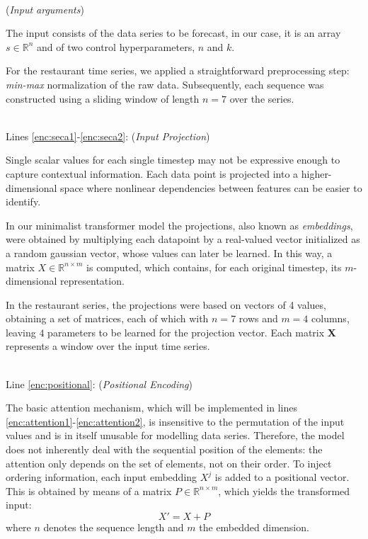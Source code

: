\documentclass[algorithms,article,submit,pdftex,moreauthors]{Definitions/mdpi}
\begin{document}
~\\(\textit{Input arguments})

The input consists of the data series to be forecast, in our case, it is an array $s \in \mathbb{R}^n$ and of two control hyperparameters, $n$ and $k$.

For the restaurant time series, we applied a straightforward preprocessing step: \textit{min-max} normalization of the raw data. Subsequently, each sequence was constructed using a sliding window of length $n = 7$ over the series.

~\\Lines \ref{enc:seca1}-\ref{enc:seca2}: (\textit{Input Projection})

Single scalar values for each single timestep may not be expressive enough to capture contextual information. Each data point is projected into a higher-dimensional space where nonlinear dependencies between features can be easier to identify. 

In our minimalist transformer model the projections, also known as {\em embeddings}, were obtained by multiplying each datapoint by a real-valued vector initialized as a random gaussian vector, whose values can later be learned. In this way, a matrix $X \in \mathbb{R}^{n\times m}$ is computed, which contains, for each original timestep, its $m$-dimensional representation.

In the restaurant series, the projections were based on vectors of 4 values, obtaining a set of matrices, each of which with $n=7$ rows and $m=4$ columns, leaving $4$ parameters to be learned for the projection vector. Each matrix {\bf X} represents a window over the input time series.

~\\Line \ref{enc:positional}: (\textit{Positional Encoding})

The basic attention mechanism, which will be implemented in lines \ref{enc:attention1}-\ref{enc:attention2}, is insensitive to the permutation of the input values \cite{VSPU17} and is in itself unusable for modelling data series. Therefore, the model does not inherently deal with the sequential position of the elements: the attention only depends on the set of elements, not on their order. To inject ordering information, each input embedding $X^j$ is added to a positional vector. 
This is obtained by means of a matrix $P \in \mathbb{R}^{n \times m}$, which yields the transformed input: 
\begin{equation}
    X' = X + P
\end{equation}
where $n$ denotes the sequence length and $m$ the embedded dimension.
\end{document}
